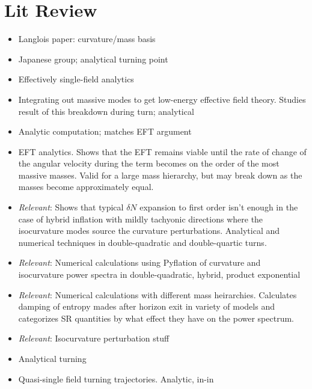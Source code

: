 \documentclass[11pt]{article}
\begin{document}
\section{Lit Review}


\begin{itemize}

  \item  Langlois paper: curvature/mass basis \cite{Gao:2013ota}

  \item  Japanese group; analytical turning point \cite{Noumi:2013cfa}

  \item Effectively single-field analytics \cite{Noumi:2012vr}

  \item Integrating out massive modes to get low-energy effective field theory.  Studies result of this breakdown during turn; analytical \cite{Gao:2012uq}

  \item Analytic computation; matches EFT argument \cite{Pi:2012gf}

  \item EFT analytics.  Shows that the EFT remains viable until the rate of change of the angular velocity during the term becomes on the order of the most massive masses.  Valid for a large mass hierarchy, but may break down as the masses become approximately equal.  \cite{Cespedes:2012hu}

  \item \emph{Relevant}: Shows that typical $\delta N$ expansion to first order isn't enough in the case of hybrid inflation with mildly tachyonic directions where the isocurvature modes source the curvature perturbations.  Analytical and numerical techniques in double-quadratic and double-quartic turns. \cite{Avgoustidis:2011em}

  \item \emph{Relevant}: Numerical calculations using Pyflation of curvature and isocurvature power spectra in double-quadratic, hybrid, product exponential \cite{Huston:2011fr}

  \item \emph{Relevant}: Numerical calculations with different mass heirarchies.  Calculates damping of entropy mades after horizon exit in variety of models and categorizes SR quantities by what effect they have on the power spectrum. \cite{Peterson:2010np}

  \item \emph{Relevant}: Isocurvature perturbation stuff \cite{Huston:2011fr,Gordon:2000hv}

  \item Analytical turning \cite{Achucarro:2010da}

  \item Quasi-single field turning trajectories.  Analytic, in-in \cite{Chen:2009zp,Chen:2009we}

\end{itemize}
\end{document}
